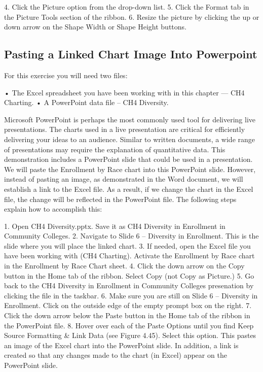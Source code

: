 4. Click the Picture option from the drop-down list.
5. Click the Format tab in the Picture Tools section of the ribbon.
6. Resize the picture by clicking the up or down arrow on the Shape Width or Shape Height buttons.



\subsection{Pasting a Linked Chart Image Into Powerpoint}

For this exercise you will need two files:

• The Excel spreadsheet you have been working with in this chapter — CH4 Charting.
• A PowerPoint data file – CH4 Diversity.

Microsoft PowerPoint is perhaps the most commonly used tool for delivering live presentations. The
charts used in a live presentation are critical for efficiently delivering your ideas to an audience.
Similar to written documents, a wide range of presentations may require the explanation of
quantitative data. This demonstration includes a PowerPoint slide that could be used in a
presentation. We will paste the Enrollment by Race chart into this PowerPoint slide. However, instead
of pasting an image, as demonstrated in the Word document, we will establish a link to the Excel file.
As a result, if we change the chart in the Excel file, the change will be reflected in the PowerPoint file.
The following steps explain how to accomplish this:

1. Open CH4 Diversity.pptx. Save it as CH4 Diversity in Enrollment in Community Colleges.
2. Navigate to Slide 6 – Diversity in Enrollment. This is the slide where you will place the linked
chart.
3. If needed, open the Excel file you have been working with (CH4 Charting). Activate the
Enrollment by Race chart in the Enrollment by Race Chart sheet.
4. Click the down arrow on the Copy button in the Home tab of the ribbon. Select Copy (not
Copy as Picture.)
5. Go back to the CH4 Diversity in Enrollment in Community Colleges presenation by clicking the file
in the taskbar.
6. Make sure you are still on Slide 6 – Diversity in Enrollment. Click on the outside edge of the
empty prompt box on the right.
7. Click the down arrow below the Paste button in the Home tab of the ribbon in the PowerPoint
file.
8. Hover over each of the Paste Options until you find Keep Source Formatting \& Link Data (see
Figure 4.45). Select this option. This pastes an image of the Excel chart into the PowerPoint
slide. In addition, a link is created so that any changes made to the chart (in Excel) appear on the
PowerPoint slide.



